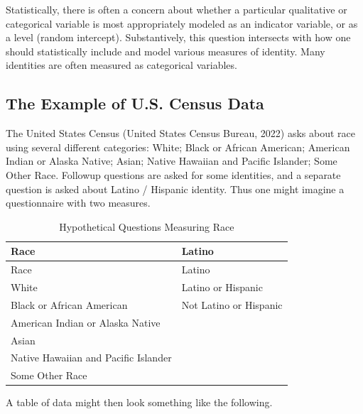 \documentclass[
  letterpaper,
  DIV=11,
  numbers=noendperiod]{scrreprt}
\begin{document}
Statistically, there is often a concern about whether a particular
qualitative or categorical variable is most appropriately modeled as an
indicator variable, or as a level (random intercept). Substantively,
this question intersects with how one should statistically include and
model various measures of identity. Many identities are often measured
as categorical variables. 

\subsection{The Example of U.S. Census
Data}\label{the-example-of-u.s.-census-data}

The United States Census (United States Census Bureau, 2022) asks about
race using several different categories: White; Black or African
American; American Indian or Alaska Native; Asian; Native Hawaiian and
Pacific Islander; Some Other Race. Followup questions are asked for some
identities, and a separate question is asked about Latino / Hispanic
identity. Thus one might imagine a questionnaire with two measures.

\begin{longtable}[]{@{}ll@{}}
\caption{Hypothetical Questions Measuring
Race}\label{tbl-race-ethnicity-questions}\tabularnewline
\toprule\noalign{}
Race & Latino \\
\midrule\noalign{}
\endfirsthead
\toprule\noalign{}
Race & Latino \\
\midrule\noalign{}
\endhead
\bottomrule\noalign{}
\endlastfoot
White & Latino or Hispanic \\
Black or African American & Not Latino or Hispanic \\
American Indian or Alaska Native & \\
Asian & \\
Native Hawaiian and Pacific Islander & \\
Some Other Race & \\
\end{longtable}

A table of data might then look something like the following.
\end{document}
